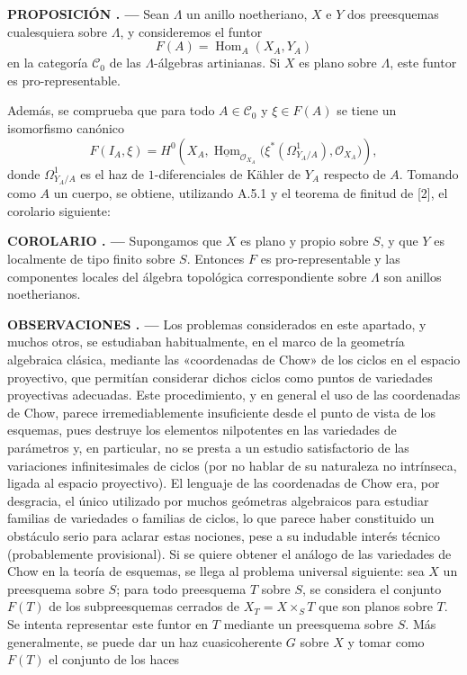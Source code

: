\documentclass[11pt,twoside,openany]{book}
\numberwithin{equation}{section}
\newcommand{\src}[1]{%
  \phantomsection\hypertarget{src:#1}{}%
  \marginpar{\raggedleft\footnotesize\sffamily #1}%
}
\theoremstyle{plain}
\theoremstyle{definition}
\theoremstyle{remark}
\newcommand{\result}[2]{%
  \par\medskip\noindent\textbf{#1%
  \if\relax\detokenize{#2}\relax\else\space#2\fi. ---}\enspace
}
\newcommand{\FgaUnitKey}{frontmatter}
\renewcommand{\src}[1]{%
  \phantomsection\hypertarget{src:\FgaUnitKey:#1}{}%
  \marginpar{\raggedleft\footnotesize\sffamily #1}%
}
\theoremstyle{plain}
\theoremstyle{definition}
\theoremstyle{remark}
\begin{document}
\src{382}
\result{PROPOSICIÓN}{2.1} Sean $\Lambda$ un anillo noetheriano, $X$ e $Y$ dos
preesquemas cualesquiera sobre $\Lambda$, y consideremos el funtor
\[
  F(A)=\operatorname{Hom}_A(X_A,Y_A)
\]
en la categoría $\mathcal C_0$ de las $\Lambda$-álgebras artinianas. Si $X$ es
plano sobre $\Lambda$, este funtor es pro-representable.

Además, se comprueba que para todo $A\in\mathcal C_0$ y $\xi\in F(A)$ se tiene
un isomorfismo canónico
\[
  F(I_A,\xi)=H^0\!\left(
    X_A,
    \underline{\operatorname{Hom}}_{\mathcal O_{X_A}}
    \bigl(\xi^*(\Omega^1_{Y_A/A}),\mathcal O_{X_A}\bigr)
  \right),
\]
donde $\Omega^1_{Y_A/A}$ es el haz de $1$-diferenciales de Kähler de $Y_A$
respecto de $A$. Tomando como $A$ un cuerpo, se obtiene, utilizando A.5.1 y el
teorema de finitud de [2], el corolario siguiente:

\result{COROLARIO}{} Supongamos que $X$ es plano y propio sobre $S$, y que $Y$
es localmente de tipo finito sobre $S$. Entonces $F$ es pro-representable y las
componentes locales del álgebra topológica correspondiente sobre $\Lambda$ son
anillos noetherianos.

\result{OBSERVACIONES}{} Los problemas considerados en este apartado, y muchos
otros, se estudiaban habitualmente, en el marco de la geometría algebraica
clásica, mediante las «coordenadas de Chow» de los ciclos en el espacio
proyectivo, que permitían considerar dichos ciclos como puntos de variedades
proyectivas adecuadas. Este procedimiento, y en general el uso de las
coordenadas de Chow, parece irremediablemente insuficiente desde el punto de
vista de los esquemas, pues destruye los elementos nilpotentes en las
variedades de parámetros y, en particular, no se presta a un estudio
satisfactorio de las variaciones infinitesimales de ciclos (por no hablar de su
naturaleza no intrínseca, ligada al espacio proyectivo). El lenguaje de las
coordenadas de Chow era, por desgracia, el único utilizado por muchos
geómetras algebraicos para estudiar familias de variedades o familias de
ciclos, lo que parece haber constituido un obstáculo serio para aclarar estas
nociones, pese a su indudable interés técnico (probablemente provisional). Si
se quiere obtener el análogo de las variedades de Chow en la teoría de
esquemas, se llega al problema universal siguiente: sea $X$ un preesquema sobre
$S$; para todo preesquema $T$ sobre $S$, se considera el conjunto $F(T)$ de los
subpreesquemas cerrados de $X_T=X\times_ST$ que son planos sobre $T$. Se intenta
representar este funtor en $T$ mediante un preesquema sobre $S$. Más
generalmente, se puede dar un haz cuasicoherente $G$ sobre $X$ y tomar como
$F(T)$ el conjunto de los haces
\end{document}
